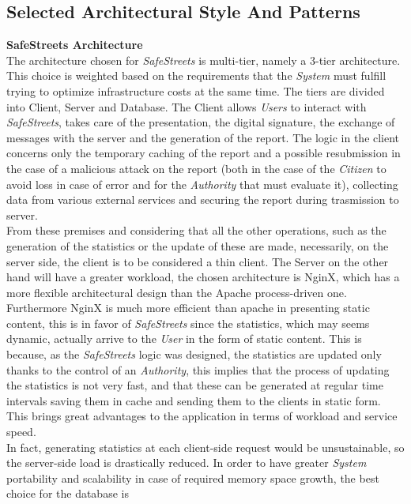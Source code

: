 \documentclass{article}
\begin{document}
\subsection{Selected Architectural Style And Patterns}
\textbf{SafeStreets Architecture} \\
The architecture chosen for \textit{SafeStreets} is multi-tier, namely a 3-tier architecture. 
This choice is weighted based on the requirements that the \textit{System} must fulfill trying 
to optimize infrastructure costs at the same time. The tiers are divided into Client, 
Server and Database. The Client allows \textit{Users} to interact with \textit{SafeStreets}, takes care of 
the presentation, the digital signature, the exchange of messages with the server and the 
generation of the report. The logic in the client concerns only the temporary caching of 
the report and a possible resubmission in the case of a malicious attack on the report 
(both in the case of the \textit{Citizen} to avoid loss in case of error and for the \textit{Authority} 
that must evaluate it), collecting data from various external services and securing the 
report during trasmission to server. \\From these premises and considering that all the other 
operations, such as the generation of the statistics or the update of these are made, 
necessarily, on the server side, the client is to be considered a thin client. 
The Server on the other hand will have a greater workload, the chosen architecture is 
NginX, which has a more flexible architectural design than the Apache process-driven one. 
Furthermore NginX is much more efficient than apache in presenting static content, 
this is in favor of \textit{SafeStreets} since the statistics, which may seems dynamic, 
actually arrive to the \textit{User} in the form of static content. This is because, as 
the \textit{SafeStreets} logic was designed, the statistics are updated only thanks to the 
control of an \textit{Authority}, this implies that the process of updating the statistics 
is not very fast, and that these can be generated at regular time intervals saving 
them in cache and sending them to the clients in static form. This brings great 
advantages to the application in terms of workload and service speed.\\ In fact, 
generating statistics at each client-side request would be unsustainable, so the 
server-side load is drastically reduced. In order to have greater \textit{System} portability and 
scalability in case of required memory space growth, the best choice for the database is 
\end{document}
